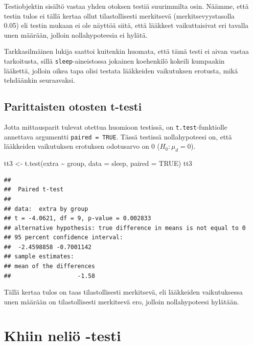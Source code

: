 \documentclass[
]{book}
\newenvironment{Shaded}{\begin{snugshade}}{\end{snugshade}}
\newcommand{\AttributeTok}[1]{\textcolor[rgb]{0.77,0.63,0.00}{#1}}
\newcommand{\ConstantTok}[1]{\textcolor[rgb]{0.00,0.00,0.00}{#1}}
\newcommand{\FunctionTok}[1]{\textcolor[rgb]{0.00,0.00,0.00}{#1}}
\newcommand{\NormalTok}[1]{#1}
\newcommand{\OtherTok}[1]{\textcolor[rgb]{0.56,0.35,0.01}{#1}}
\newcommand{\SpecialCharTok}[1]{\textcolor[rgb]{0.00,0.00,0.00}{#1}}
\begin{document}
Testiobjektin sisältö vastaa yhden otoksen testiä suurimmilta osin. Näämme, että testin tulos ei tällä kertaa ollut tilastollisesti merkitsevä (merkitsevyystasolla 0.05) eli testin mukaan ei ole näyttöä siitä, että lääkkeet vaikuttaisivat eri tavalla unen määrään, jolloin nollahypoteesia ei hylätä.

Tarkkasilmäinen lukija saattoi kuitenkin huomata, että tämä testi ei aivan vastaa tarkoitusta, sillä \texttt{sleep}-aineistossa jokainen koehenkilö kokeili kumpaakin lääkettä, jolloin oikea tapa olisi testata lääkkeiden vaikutuksen erotusta, mikä tehdäänkin seuraavaksi.

\hypertarget{parittaisten-otosten-t-testi}{%
\subsection{Parittaisten otosten t-testi}\label{parittaisten-otosten-t-testi}}

Jotta mittausparit tulevat otettua huomioon testissä, on \texttt{t.test}-funktiolle annettava argumentti \texttt{paired\ =\ TRUE}. Tässä testissä nollahypoteesi on, että lääkkeiden vaikutuksen erotuksen odotusarvo on 0 (\(H_0 : \mu_d = 0\)).

\begin{Shaded}
\begin{Highlighting}[]
\NormalTok{tt3 }\OtherTok{\textless{}{-}} \FunctionTok{t.test}\NormalTok{(extra }\SpecialCharTok{\textasciitilde{}}\NormalTok{ group, }\AttributeTok{data =}\NormalTok{ sleep, }\AttributeTok{paired =} \ConstantTok{TRUE}\NormalTok{)}
\NormalTok{tt3}
\end{Highlighting}
\end{Shaded}

\begin{verbatim}
## 
##  Paired t-test
## 
## data:  extra by group
## t = -4.0621, df = 9, p-value = 0.002833
## alternative hypothesis: true difference in means is not equal to 0
## 95 percent confidence interval:
##  -2.4598858 -0.7001142
## sample estimates:
## mean of the differences 
##                   -1.58
\end{verbatim}

Tällä kertaa tulos on taas tilastollisesti merkitsevä, eli lääkkeiden vaikutuksessa unen määrään on tilastollisesti merkitsevä ero, jolloin nollahypoteesi hylätään.

\hypertarget{chi-squared-test}{%
\section{Khiin neliö -testi}\label{chi-squared-test}}
\end{document}
